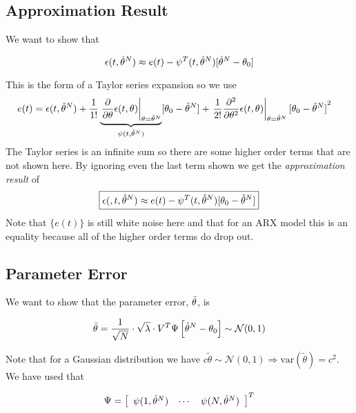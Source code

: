 \subsection{Approximation Result}
We want to show that

\begin{equation*}
\epsilon(t,\hat{\theta}^N) \approx e(t) - \psi^T(t,\hat{\theta}^N)[\hat{\theta}^N-\theta_0]
\end{equation*}

This is the form of a Taylor series expansion so we use
\begin{align*}
e(t) &= \epsilon(t,\hat{\theta}^N) + \frac{1}{1!}\underbrace{\left.\frac{\partial}{\partial\theta}\epsilon(t,\theta)\right|_{\theta=\hat{\theta}^N}}_{\psi(t,\hat{\theta}^N)}[\theta_0-\hat{\theta}^N] + \left.\frac{1}{2!}\frac{\partial^2}{\partial\theta^2}\epsilon(t,\theta)\right|_{\theta=\hat{\theta}^N}{[\theta_0-\hat{\theta}^N]}^2
\end{align*}
The Taylor series is an infinite sum so there are some higher order terms that are not shown here.
By ignoring even the last term shown we get the \textit{approximation result} of
\begin{align}
\label{eq:14approximation}
\boxed{\epsilon(,t,\hat{\theta}^N) \approx e(t) - \psi^T(t,\hat{\theta}^N)[\theta_0-\hat{\theta}^N]}
\end{align}
Note that $\{e(t)\}$ is still white noise here and that for an ARX model this is an equality because all of the higher order terms do drop out.

\subsection{Parameter Error}
We want to show that the parameter error, $\bar{\theta}$, is

\begin{equation*}
\bar{\theta} = \frac{1}{\sqrt{N}}\cdot\sqrt{\lambda}\cdot V^T\Psi\left[\hat{\theta}^N-\theta_0\right] \sim \mathcal{N}(0,1)
\end{equation*}

Note that for a Gaussian distribution we have $c\tilde{\theta}\sim\mathcal{N}(0,1)\Rightarrow \text{var}(\tilde{\theta})=c^2$.
We have used that

\begin{equation*}
\Psi = \left[\begin{array}{c c c} \psi(1,\hat{\theta}^N) & \cdots & \psi(N,\hat{\theta}^N) \end{array}\right]^T
\end{equation*}

